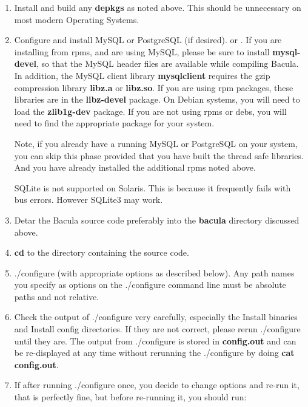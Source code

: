 \begin{enumerate}
\item Install and build any {\bf depkgs} as noted above. This
   should be unnecessary on most modern Operating Systems.

\item Configure and install MySQL or PostgreSQL (if desired). 
    or  
   .  If you are installing from rpms, and are
   using MySQL, please be sure to install  {\bf mysql-devel}, so that the MySQL
   header files are available  while compiling Bacula. In addition, the MySQL
   client  library {\bf mysqlclient} requires the gzip compression library  {\bf
   libz.a} or {\bf libz.so}. If you are using rpm packages,  these libraries are
   in the {\bf libz-devel} package. On Debian  systems, you will need to load the
   {\bf zlib1g-dev} package. If  you are not using rpms or debs, you will need to
   find the  appropriate package for your system.  

   Note, if you already have a running MySQL or PostgreSQL on your system, you 
   can skip this phase provided that you have built the thread  safe libraries.
   And you have already installed the additional  rpms noted above.  

   SQLite is not supported on Solaris. This is because it
   frequently fails with bus errors.  However SQLite3 may work.

\item Detar the Bacula source code preferably into the {\bf bacula}  directory
   discussed above.  

\item {\bf cd} to the directory containing the source code.  

\item ./configure (with appropriate options as described below). Any
   path names you specify as options on the ./configure command line
   must be absolute paths and not relative.

\item Check the output of ./configure very carefully, especially  the Install
   binaries and Install config directories.  If they are not correct,
   please rerun ./configure until they  are. The output from ./configure is
   stored in {\bf config.out}  and can be re-displayed at any time without
   rerunning the  ./configure by doing {\bf cat config.out}.  

\item If after running ./configure once, you decide to change options  and
   re-run it, that is perfectly fine, but before re-running it,  you should run: 


\end{enumerate}

